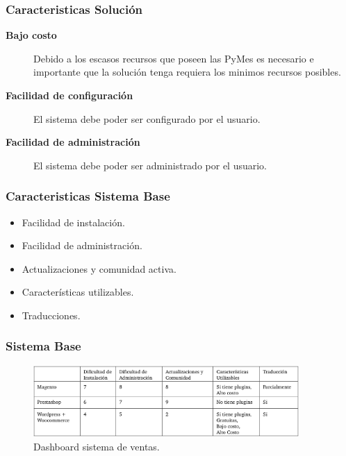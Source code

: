 \documentclass[10pt, compress]{beamer}
\begin{document}
\begin{frame}
 \frametitle{Caracteristicas Solución}
\begin{description}
 \item[\textbf{Bajo costo}] Debido a los escasos recursos que poseen las PyMes es necesario e importante que
la solución tenga requiera los minimos recursos posibles.
 \item[\textbf{Facilidad de configuración}] El sistema debe poder ser configurado por el usuario.
 \item[\textbf{Facilidad de administración}] El sistema debe poder ser administrado por el usuario.
\end{description}
\end{frame}

\begin{frame}
 \frametitle{Caracteristicas Sistema Base}

\begin{itemize}[<+- | alert@+>]
 \item Facilidad de instalación.
 \item Facilidad de administración.
 \item Actualizaciones y comunidad activa.
 \item Características utilizables.
 \item Traducciones.
\end{itemize}
\end{frame}

\begin{frame}
 \frametitle{Sistema Base}

\begin{figure}
\centering
    \includegraphics[width=0.9\textwidth]{images/tablaWord.png}
    \caption{Dashboard sistema de ventas.}
    \label{fig:awesome_image}
\end{figure}

\end{frame}
\end{document}

